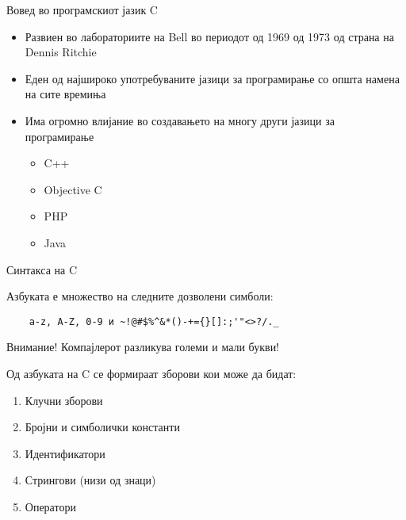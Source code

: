 \begin{frame}{Вовед во програмскиот јазик C}
\begin{itemize}
\item Развиен во лабораториите на Bell во периодот од 1969 од 1973 од страна на Dennis Ritchie
\item Еден од најшироко употребуваните јазици за програмирање со општа намена на сите времиња
\item Има огромно влијание во создавањето на многу други јазици за програмирање
    \begin{itemize}
    \item C++
    \item Objective C
    \item PHP
    \item Java
    \end{itemize}
\end{itemize}
\end{frame}
\begin{frame}[fragile]{Синтакса на C}

  \begin{block}{Азбуката е множество на следните дозволени симболи:}
  \begin{verbatim}
    a-z, A-Z, 0-9 и ~!@#$%^&*()-+={}[]:;'"<>?/._  
  \end{verbatim}
  \end{block}

    \begin{alertblock}{Внимание!}
    Компајлерот разликува големи и мали букви!
    \end{alertblock}

    Од азбуката на C се формираат зборови кои може да бидат:
    \begin{enumerate}
    \item Клучни зборови
    \item Бројни и симболички константи
    \item Идентификатори
    \item Стрингови (низи од знаци)
    \item Оператори
    \end{enumerate}

\end{frame}

